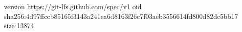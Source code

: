 version https://git-lfs.github.com/spec/v1
oid sha256:4d97ffccb85165f3143a241ea6d8163f26c7f03aeb3556614fd800d82dc5bb17
size 13874
